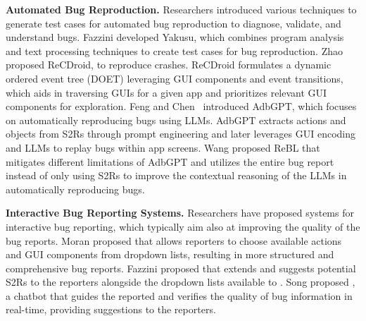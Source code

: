 \textbf{Automated Bug Reproduction.} 
Researchers introduced various techniques to generate test cases for automated bug reproduction to diagnose, validate, and understand bugs. Fazzini  \etal \cite{Fazzini2018} developed Yakusu, which combines program analysis and text processing techniques to create test cases for bug reproduction.  
Zhao  \etal \cite{Zhao2019} proposed ReCDroid, to reproduce crashes. ReCDroid formulates a dynamic ordered event tree (DOET) leveraging GUI components and event transitions, which aids in traversing GUIs for a given app and prioritizes relevant GUI components for exploration. 
Feng and Chen~\cite{Feng2024} introduced AdbGPT, which focuses on automatically reproducing bugs using LLMs. AdbGPT extracts actions and objects from S2Rs through prompt engineering and later leverages GUI encoding and LLMs to replay bugs within app screens. Wang  \etal \cite{Wang2024} proposed ReBL that mitigates different limitations of AdbGPT and utilizes the entire bug report instead of only using S2Rs to improve the contextual reasoning of the LLMs in automatically reproducing bugs.

\textbf{Interactive Bug Reporting Systems.}
Researchers have proposed systems for interactive bug reporting, which typically aim also at improving the quality of the bug reports.
 Moran  \etal proposed \Fusion \cite{Moran2015} that allows reporters to choose available actions and GUI components from dropdown lists, resulting in more structured and comprehensive bug reports. 
 Fazzini  \etal proposed \ebug \cite{Fazzini:TSE22} that extends \Fusion and suggests potential S2Rs to the reporters alongside the dropdown lists available to \Fusion.
 Song  \etal proposed \burt \cite{song2022toward, song2022burt}, a chatbot that guides the reported and verifies the quality of bug information in real-time, providing suggestions to the reporters.
